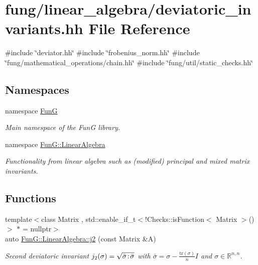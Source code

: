 \hypertarget{deviatoric__invariants_8hh}{\section{fung/linear\-\_\-algebra/deviatoric\-\_\-invariants.hh \-File \-Reference}
\label{deviatoric__invariants_8hh}
}
{\ttfamily \#include \char`\"{}deviator.\-hh\char`\"{}}\*
{\ttfamily \#include \char`\"{}frobenius\-\_\-norm.\-hh\char`\"{}}\*
{\ttfamily \#include \char`\"{}fung/mathematical\-\_\-operations/chain.\-hh\char`\"{}}\*
{\ttfamily \#include \char`\"{}fung/util/static\-\_\-checks.\-hh\char`\"{}}\*
\subsection*{\-Namespaces}
\begin{DoxyCompactItemize}
\item 
namespace \hyperlink{namespaceFunG}{\-Fun\-G}
\begin{DoxyCompactList}\small\item\em \-Main namespace of the \-Fun\-G library. \end{DoxyCompactList}\item 
namespace \hyperlink{namespaceFunG_1_1LinearAlgebra}{\-Fun\-G\-::\-Linear\-Algebra}
\begin{DoxyCompactList}\small\item\em \-Functionality from linear algebra such as (modified) principal and mixed matrix invariants. \end{DoxyCompactList}\end{DoxyCompactItemize}
\subsection*{\-Functions}
\begin{DoxyCompactItemize}
\item 
{\footnotesize template$<$class Matrix , std\-::enable\-\_\-if\-\_\-t$<$!\-Checks\-::is\-Function$<$ Matrix $>$()$>$ $\ast$  = nullptr$>$ }\\auto \hyperlink{group__InvariantGroup_ga9a2bc859fe1ae34b1a3ada91a39d69df}{\-Fun\-G\-::\-Linear\-Algebra\-::j2} (const \-Matrix \&\-A)
\begin{DoxyCompactList}\small\item\em \-Second deviatoric invariant $ j_2(\sigma)=\sqrt{\bar\sigma\negthinspace:\negthinspace\bar\sigma} $ with $\bar\sigma = \sigma - \frac{\mathrm{tr}(\sigma)}{n}I$ and $\sigma\in\mathbb{R}^{n,n}$. \end{DoxyCompactList}\end{DoxyCompactItemize}
